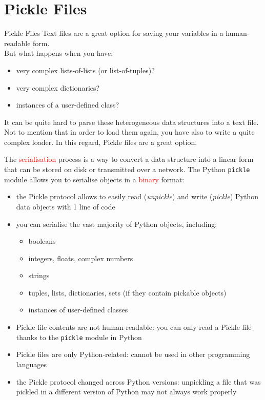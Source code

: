 \documentclass[t,handout,9pt]{beamer}
\newcommand{\cmark}{\ding{51}}%
\newcommand{\xmark}{\ding{55}}%
\begin{document}
\section{Pickle Files}
\begin{frame}{Pickle Files}
\vfill
Text files are a great option for saving your variables in a human-readable form.\\
But what happens when you have:
\begin{itemize}
	\item very complex lists-of-lists (or list-of-tuples)?
	\item very complex dictionaries?
	\item instances of a user-defined class?
\end{itemize}
It can be quite hard to parse these heterogeneous data structures into a text file.\\
Not to mention that in order to load them again, you have also to write a quite complex loader.
\vfill
In this regard, Pickle files are a great option.
\vfill
\end{frame}
%
\begin{frame}
\vfill
The \textcolor{red}{serialisation} process is a way to convert a data structure into a linear form that can be stored on disk or transmitted over a network.
\vfill
The Python \texttt{pickle} module allows you to serialise objects in a \textcolor{red}{binary} format:
\begin{itemize}
	\item[\cmark] the Pickle protocol allows to easily read (\textit{unpickle}) and write (\textit{pickle}) Python data objects with 1 line of code
	\item[\cmark] you can serialise the vast majority of Python objects, including:
	\begin{itemize}
		\item booleans
		\item integers, floats, complex numbers
		\item strings
		\item tuples, lists, dictionaries, sets (if they contain pickable objects)
		\item instances of user-defined classes
	\end{itemize}
	\item[\xmark] Pickle file contents are not human-readable: you can only read a Pickle file thanks to the \texttt{pickle} module in Python
	\item[\xmark] Pickle files are only Python-related: cannot be used in other programming languages
	\item[\xmark] the Pickle protocol changed across Python versions: unpickling a file that was pickled in a different version of Python may not always work properly
\end{itemize}
\vfill
\end{frame}
%
\end{document}
